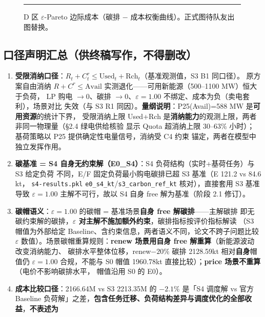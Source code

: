 \documentclass{internal-report}
\begin{document}
\begin{figure}[H]
\centering
\rule{0.9\textwidth}{4cm}
\caption{D 区 $\varepsilon$-Pareto 边际成本（碳排 $-$ 成本权衡曲线）。正式图待队友出图替换。}
\label{fig:dpar}
\end{figure}

\subsection{口径声明汇总（供终稿写作，不得删改）}
\label{sec:caliber}

\begin{enumerate}
  \item \textbf{受限消纳口径}：$R_t+C^r_t \le \text{Used}_t+\text{Rch}_t$（基准观测值，S3 B1 同口径）。
        原方案自由消纳 $R+C^r\le\text{Avail}$ 实测退化——可用新能源（500--1100 MW）恒大于负荷，
        LP 购电 $\to 0$、碳排 $\to 0$、$\varepsilon{=}1.00$ 不绑定、成本为负（卖电套利），场景对比
        失效（与 S3 R1 同因）。\textbf{量纲说明}：P25(Avail)=588 MW 是\textbf{可用资源}的统计下界，
        受限消纳上限 Used+Rch 是\textbf{消纳能力}的观测上限，两者非同一物理量（§2.4 绿电供给核验
        显示 Quota 超消纳上限 30--63\% 小时）；基荷策略以 P25 提供确定性电量信号，消纳受 C4 约束
        锚定，两者在模型中独立发挥作用。
  \item \textbf{碳基准 = S4 自身无约束解（E0\_S4）}：S4 负荷结构（实时+基荷任务）与 S3 给定负荷
        不同，E/F 固定负荷最小购电碳排已超 S3 基准（E 121.2 vs 84.6 kt，
        \texttt{s4-results.pkl} \texttt{e0\_s4\_kt}/\texttt{s3\_carbon\_ref\_kt} 核对），直接套用
        S3 基准导致 $\varepsilon{=}1.00$ 主解不可行，故以 S4 自身 free 解为基准（阶段 2.1 修订）。
  \item \textbf{碳帽语义}：$\varepsilon{=}1.00$ 的碳帽 = 基准场景\textbf{自身 free 解碳排}——主解碳排
        即无碳约束解的碳排，\textbf{$\varepsilon$ 对主解不施加额外约束}，碳排指标按评价指标解读
        （S3 帽值为外部给定 Baseline、含约束信息，两者语义不同，论文不跨子问题比较 $\varepsilon$
        数值）。场景碳帽重算规则：\textbf{renew 场景用自身 free 解重算}（新能源波动改变消纳能力、
        碳排水平整体位移，renew$-20\%$ 碳排 2128.59kt 相对\textbf{自身}帽值仍 $\varepsilon{=}1.00$
        合规，不能与 S0 帽值 1960.78kt 直接比较）；\textbf{price 场景不重算}（电价不影响碳排水平，
        帽值沿用 S0 的 E0）。
  \item \textbf{成本比较口径}：2166.64M vs S3 2213.35M 的 $-2.1\%$ 是「S4 调度解 vs 官方 Baseline
        负荷解」之差，\textbf{包含任务迁移、负荷结构差异与调度优化的全部收益}，\textbf{不表述为
}
\end{enumerate}
\end{document}
